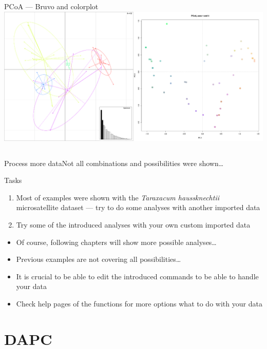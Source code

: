\documentclass[compress, ucs, xelatex, 11pt, xcolor=svgnames,
	hyperref={
		bookmarks=true,
		unicode=true,
		colorlinks=true,
		pdftitle={Molecular data in R},
		plainpages=false,
		pdfauthor={Vojtech Zeisek},
		pdfsubject={Course about phylogeny and evolution in R},
		pdfcreator={XeLaTeX},
		pdfkeywords={R, evolution, phylogeny, molecular data},
		linkcolor=Tomato,
		anchorcolor=SaddleBrown,
		citecolor=Goldenrod,
		filecolor=DarkMagenta,
		menucolor=Sienna,
		urlcolor=DarkTurquoise,
		pdftex},
	url={hyphens, lowtilde} %
	]{beamer}
\begin{document}
\begin{frame}{PCoA --- Bruvo and colorplot}
  \includegraphics[width=\textwidth]{pcoa-dalsi.png}
\end{frame}

\subsection{}

\begin{frame}{Process more data}{Not all combinations and possibilities were shown\ldots}
	\begin{block}{Tasks}
		\begin{enumerate}
			\item Most of examples were shown with the \textit{Taraxacum haussknechtii} microsatellite dataset --- try to do some analyses with another imported data
			\item Try some of the introduced analyses with your own custom imported data
		\end{enumerate}
	\end{block}
	\begin{itemize}
		\item Of course, following chapters will show more possible analyses\ldots
		\item Previous examples are not covering all possibilities\ldots
		\item It is crucial to be able to edit the introduced commands to be able to handle your data
		\item Check help pages of the functions for more options what to do with your data
	\end{itemize}
\end{frame}

\section{DAPC}
\end{document}
